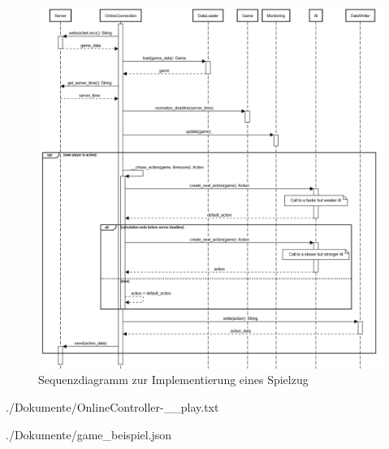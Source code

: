 \begin{figure}[htb]
	\centering
	\includegraphics[width=\textwidth]{Bilder/Sequenzdiagramm_Implementierung_Spielzug.png}
	\caption{Sequenzdiagramm zur Implementierung eines Spielzug}
	\label{fig:sequenzdiagramm-spielzug}
\end{figure}
\clearpage

\begin{minipage}{\textwidth}
	
	{./Dokumente/OnlineController-__play.txt}
\end{minipage}
\clearpage

\begin{minipage}{\textwidth}
	
	{./Dokumente/game_beispiel.json}
\end{minipage}
\clearpage

